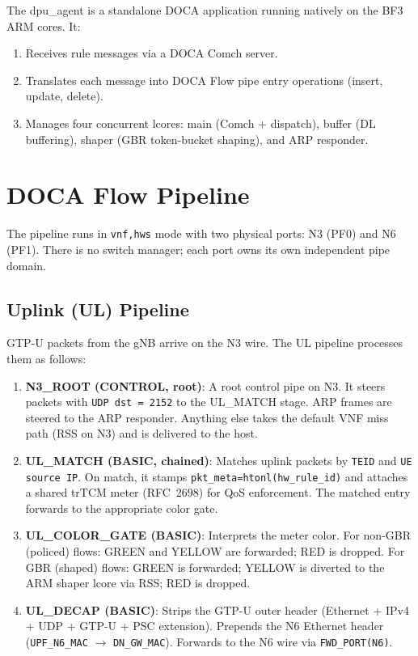 \documentclass[conference]{IEEEtran}
\newcommand{\code}[1]{\nolinkurl{#1}}
\begin{document}
The dpu\_agent is a standalone DOCA application running natively on the BF3
ARM cores.  It:
\begin{enumerate}
  \item Receives rule messages via a DOCA Comch server.
  \item Translates each message into DOCA Flow pipe entry operations
        (insert, update, delete).
  \item Manages four concurrent lcores: main (Comch + dispatch), buffer
        (DL buffering), shaper (GBR token-bucket shaping), and ARP responder.
\end{enumerate}

\section{DOCA Flow Pipeline}
\label{sec:pipeline}

The pipeline runs in \texttt{vnf,hws} mode with two physical ports: N3
(PF0) and N6 (PF1).  There is no switch manager; each port owns its own
independent pipe domain.

\subsection{Uplink (UL) Pipeline}

GTP-U packets from the gNB arrive on the N3 wire.  The UL pipeline processes
them as follows:

\begin{enumerate}
  \item \textbf{N3\_ROOT (CONTROL, root)}: A root control pipe on N3.
        It steers packets with \texttt{UDP dst = 2152} to the
        UL\_MATCH stage.  ARP frames are steered to the ARP
        responder.  Anything else takes the default VNF miss path
        (RSS on N3) and is delivered to the host.

  \item \textbf{UL\_MATCH (BASIC, chained)}: Matches uplink packets by
        \texttt{TEID} and \texttt{UE source IP}.  On match, it stamps
        \code{pkt_meta=htonl(hw_rule_id)} and attaches a shared
        trTCM meter (RFC~2698) for QoS enforcement.  The matched entry
        forwards to the appropriate color gate.

  \item \textbf{UL\_COLOR\_GATE (BASIC)}: Interprets the meter color.  For
        non-GBR (policed) flows: GREEN and YELLOW are forwarded; RED is
        dropped.  For GBR (shaped) flows: GREEN is forwarded; YELLOW is
        diverted to the ARM shaper lcore via RSS; RED is dropped.

  \item \textbf{UL\_DECAP (BASIC)}: Strips the GTP-U outer header
        (Ethernet + IPv4 + UDP + GTP-U + PSC extension).  Prepends the N6
        Ethernet header (\code{UPF_N6_MAC} $\to$ \code{DN_GW_MAC}).
        Forwards to the N6 wire via \texttt{FWD\_PORT(N6)}.
\end{enumerate}
\end{document}
